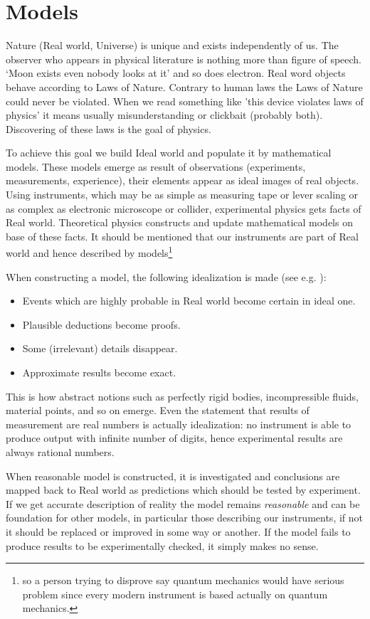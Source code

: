 \chapter{Models}
\label {models}
Nature (Real world, Universe) is unique and exists independently of us. The observer who appears in physical
literature is nothing more than figure of speech. `Moon exists even nobody looks at it' and so does electron.
Real word objects behave according to Laws of Nature. Contrary to human laws the Laws of Nature could never be violated.
When we read something like 'this device violates laws of physics' it means usually misunderstanding or clickbait (probably both). Discovering of these laws is the goal of physics. 

To achieve this goal
we build Ideal world and populate it by mathematical models. These models emerge as result of  observations (experiments, measurements, experience), 
their elements appear as ideal images of real objects. Using instruments, 
which may be as simple as measuring tape or lever scaling or as complex as electronic microscope or collider, experimental physics gets facts of Real world.
Theoretical physics constructs and update mathematical models 
on base of these facts.
It should be mentioned that our instruments are part of Real world  and hence described by models\footnote{so a person trying 
to disprove say quantum mechanics would have serious problem since every modern instrument is based actually on quantum 
mechanics.}

    When constructing a model, the following idealization is
   made (see e.g. \cite{Arnold-mt}): 
\begin{itemize}
    \item Events which are  highly probable in Real world become certain in ideal one.
    \item Plausible deductions become proofs.
    \item Some (irrelevant) details disappear.
    \item Approximate results become exact.
\end{itemize}               

This is how abstract notions such as perfectly rigid bodies, incompressible fluids, material points, and so on emerge. 
Even the statement that results of measurement are real numbers is actually idealization: no instrument is able to produce output with infinite number of digits, hence experimental results are always rational numbers.

 When reasonable model is constructed, 
it is investigated and conclusions are mapped back to Real world as predictions which 
should be tested by  experiment. 
If we get  accurate description of reality the model remains {\em reasonable} and can be foundation 
for other models, in particular those describing our instruments, if not it  should be replaced or improved in some way or another.
If the model fails to produce results to be experimentally checked, it simply makes no sense.

